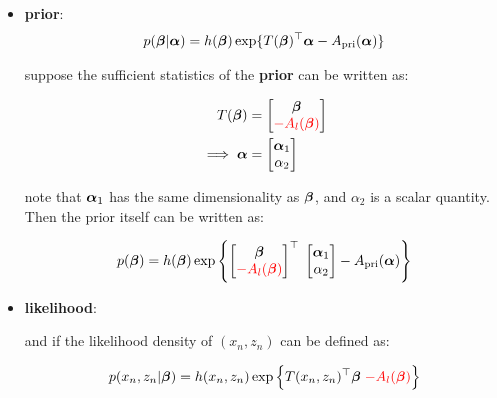 \documentclass{article}
\def\pri{\text{pri}}
\begin{document}
\begin{itemize}

\item {\bf prior}:
\begin{equation}\begin{split}
p (\bbeta | \aalpha ) &= h (\bbeta) \exp \{  T(\bbeta)^\top \aalpha- A_\pri (\aalpha)\}\\ 
\end{split}\end{equation}

suppose the sufficient statistics of the {\bf prior} can be written as:

\begin{equation}\begin{split}
T(\boldsymbol{\beta}) &=
\begin{bmatrix}
\boldsymbol{\beta} \\ {\color{red} -A_l(\boldsymbol{\beta})}
\end{bmatrix}\\
\implies \boldsymbol{\alpha} &= 
\begin{bmatrix}
\boldsymbol{\alpha}_1 \\ \alpha_2
\end{bmatrix}
\end{split}\end{equation}

note that $\boldsymbol{\alpha}_1$ has the same dimensionality as $\boldsymbol{\beta}$, and $\alpha_2$ is a scalar quantity. Then the prior itself can be written as:

\begin{equation}\begin{split}
p (\bbeta) &= h (\bbeta) \exp \left\{\begin{bmatrix} \bbeta \\ {\color{red} - A_l(\bbeta)} \end{bmatrix}^\top \;
\begin{bmatrix} \aalpha_1 \\ \alpha_2  \end{bmatrix}  - A_{\pri} (\aalpha) \right\}\\
\end{split}\end{equation}

\item {\bf likelihood}:

and if the likelihood density of $(x_n, z_n)$ can be defined as:

\begin{equation}\begin{split}
p(x_n, z_n | \boldsymbol{\beta} ) = h(x_n,z_n) \exp\Big\{  T ( x_n, z_n)^\top \boldsymbol{\beta} \; {\color{red} - A_l(\boldsymbol{\beta})} \Big\} \\
\end{split}\end{equation}


\end{itemize}
\end{document}
